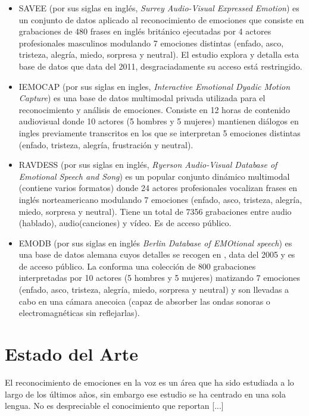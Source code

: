 \documentclass[11pt,a4paper,spanish]{book}
\begin{document}
	\begin{itemize}
		\item SAVEE (por sus siglas en inglés, \emph{ Surrey Audio-Visual Expressed Emotion}) es un conjunto de datos aplicado al reconocimiento de emociones que consiste en grabaciones de 480 frases en inglés británico ejecutadas por 4 actores profesionales masculinos modulando 7 emociones distintas (enfado, asco, tristeza, alegría, miedo, sorpresa y neutral). El estudio \cite{SAVEEdataset} explora y detalla esta base de datos que data del 2011, desgraciadamente su acceso está restringido.
		
		\item IEMOCAP (por sus siglas en ingles, \emph{Interactive Emotional Dyadic Motion Capture}) es una base de datos multimodal privada utilizada para el reconocimiento y análisis de emociones. Consiste en 12 horas de contenido audiovisual donde 10 actores (5 hombres y 5 mujeres) mantienen diálogos en ingles previamente transcritos en los que se interpretan 5 emociones distintas (enfado, tristeza, alegría, frustración y neutral).
		
		\item RAVDESS (por sus siglas en inglés, \emph{Ryerson Audio-Visual Database of Emotional Speech and Song}) es un popular conjunto dinámico multimodal (contiene varios formatos) donde 24 actores profesionales vocalizan frases en inglés norteamericano modulando 7 emociones (enfado, asco, tristeza, alegría, miedo, sorpresa y neutral). Tiene un total de 7356 grabaciones entre audio (hablado), audio(canciones) y vídeo. Es de acceso público.
		
		\item EMODB (por sus siglas en inglés \emph{Berlin Database of EMOtional speech}) es una base de datos alemana cuyos detalles se recogen en \cite{emodb2005}, data del 2005 y es de acceso público. La conforma una colección de 800 grabaciones interpretadas por 10 actores (5 hombres y 5 mujeres) matizando 7 emociones (enfado, asco, tristeza, alegría, miedo, sorpresa y neutral) y son llevadas a cabo en una cámara anecoica (capaz de absorber las ondas sonoras o electromagnéticas sin reflejarlas).
		
	\end{itemize}

	

	
	\section{Estado del Arte}
	El reconocimiento de emociones en la voz es un área que ha sido estudiada a lo largo de los últimos años, sin embargo ese estudio se ha centrado en una sola lengua.
	No es despreciable el conocimiento que reportan [...]
\end{document}
